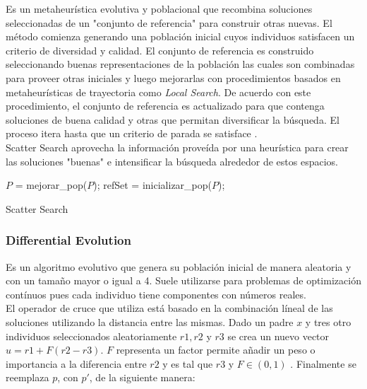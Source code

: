 \documentclass{ci5652}
\begin{document}
Es un metaheurística evolutiva y poblacional que recombina soluciones
seleccionadas de un "conjunto de referencia" para construir otras nuevas. El
método comienza generando una población inicial cuyos individuos satisfacen un
criterio de diversidad y calidad. El conjunto de referencia es construido
seleccionando buenas representaciones de la población las cuales son combinadas
para proveer otras iniciales y luego mejorarlas con procedimientos basados en
metaheurísticas de trayectoria como \textit{Local Search}. De acuerdo con este
procedimiento, el conjunto de referencia es actualizado para que contenga
soluciones de buena calidad y otras que permitan diversificar la búsqueda. El
proceso itera hasta que un criterio de parada se satisface \cite{Talbi_2009}.\\

Scatter Search aprovecha la información proveída por una heurística para crear
las soluciones "buenas" e intensificar la búsqueda alrededor de estos espacios.

\begin{algorithm}
 \DontPrintSemicolon
 \vspace*{0.1cm}
  $P$ = mejorar\_pop($P$);\;
  refSet = inicializar\_pop($P$);\;
 \vspace*{0.1cm}
 \caption{Scatter Search}
\end{algorithm}


\subsubsection{Differential Evolution}

Es un algoritmo evolutivo que genera su población inicial de manera aleatoria y
con un tamaño mayor o igual a 4. Suele utilizarse para problemas de optimización
contínuos pues cada individuo tiene componentes con números reales.\\

El operador de cruce que utiliza está basado en la combinación líneal de las
soluciones utilizando la distancia entre las mismas. Dado un padre $x$ y tres
otro individuos seleccionados aleatoriamente $r1, r2$ y $r3$ se crea un nuevo
vector $u = r1 + F(r2 - r3)$. $F$ representa un factor permite añadir un peso o
importancia a la diferencia entre $r2$ y es tal que $r3$ y $F \in (0, 1)$
\cite{Glover_2003}. Finalmente se reemplaza $p$, con $p'$, de la
siguiente manera:
\end{document}
